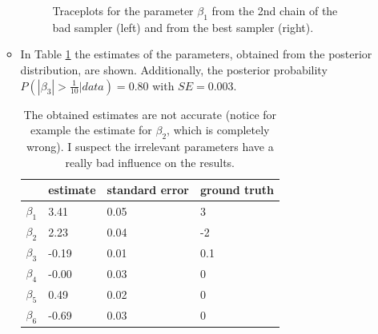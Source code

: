 \documentclass[12pt]{article}
\begin{document}
\begin{enumerate}[A)]
\begin{itemize}
\begin{figure}
            \caption{Traceplots for the parameter $\beta_1$ from the 2nd chain of the bad sampler (left) and from the best sampler (right). }
            \label{fig:log}
        \end{figure}
        \item In Table \ref{tab:post} the estimates of the parameters, obtained from the posterior distribution, are shown. Additionally, the posterior probability $P(|\beta_3| > \frac{1}{10} | data) = 0.80$ with $SE = 0.003$.
        \begin{table}
            \centering
            \begin{tabular}{l|ll|l}
             & estimate & standard error & ground truth \\ \hline
            $\beta_1$ & 3.41 & 0.05 & 3 \\
            $\beta_2$ & 2.23 & 0.04 & -2 \\
            $\beta_3$ & -0.19 & 0.01 & 0.1 \\
            $\beta_4$ & -0.00 & 0.03 & 0 \\
            $\beta_5$ & 0.49 & 0.02 & 0 \\
            $\beta_6$ & -0.69 & 0.03 & 0
            \end{tabular}
            \caption{The obtained estimates are not accurate (notice for example the estimate for $\beta_2$, which is completely wrong). I suspect the irrelevant parameters have a really bad influence on the results.}
            \label{tab:post}
        \end{table}
    \end{itemize}

\end{enumerate}
\end{document}
